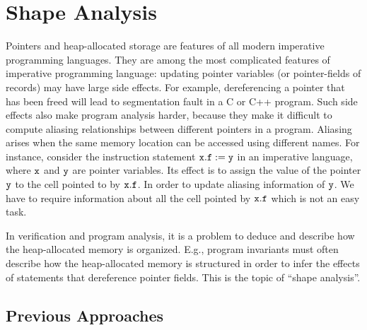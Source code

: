
\chapter{Shape Analysis}
Pointers and heap-allocated storage are features of all modern imperative programming languages.
They are among the most
complicated features of imperative programming language:
updating pointer variables (or pointer-fields of records) may have large side effects.
For example, dereferencing a pointer that has been freed will lead to segmentation fault in a C or C++ program.
Such side effects also make program analysis harder, because they make it
difficult to compute aliasing relationships between different pointers in a program. Aliasing arises when the same memory location can be accessed using different names.
For instance, consider the instruction statement $\tt x.f := y$ in an imperative language, where $\tt x$ and $\tt y$ are pointer variables. Its effect is to assign the value of the pointer $\tt y$ to the cell pointed to by $\tt x.f$. In order to update aliasing information of $\tt y$. We have to require information about all the cell pointed by $\tt x.f$ which is not an easy task.

In verification and program analysis, it is a problem to deduce and describe  how the heap-allocated memory is organized. E.g., program invariants must often describe how the heap-allocated memory is structured in order to infer the effects of statements that dereference pointer fields. This is the topic of ``shape analysis''.


\section{Previous Approaches} 

